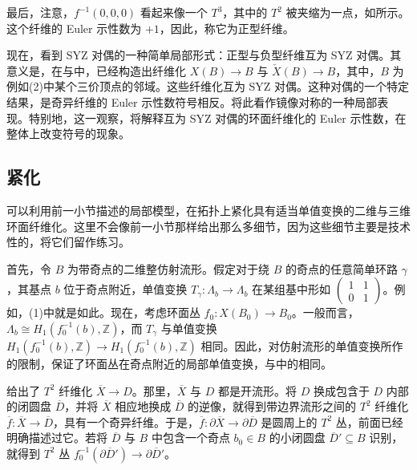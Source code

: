 \begin{definition*}[正型纤维]\label{def:6.positive-fibre}
最后，注意，$f^{-1}(0,0,0)$ 看起来像一个 $T^3$，其中的 $T^2$ 被夹缩为一点，如所示。这个纤维的 Euler 示性数为 $+1$，因此，称它为正型纤维。
\end{definition*}
\begin{figure}[H]
\centering
{}
\BookNumberOnlyCaption\label{fig:6.10}
\end{figure}

现在，看到 SYZ 对偶的一种简单局部形式：正型与负型纤维互为 SYZ 对偶。其意义是，在与中，已经构造出纤维化 $X(B)\to B$ 与 $\check X(B)\to B$，其中，$B$ 为例如(2)中某个三价顶点的邻域。这些纤维化互为 SYZ 对偶。这种对偶的一个特定结果，是奇异纤维的 Euler 示性数符号相反。将此看作镜像对称的一种局部表现。特别地，这一观察，将解释互为 SYZ 对偶的环面纤维化的 Euler 示性数，在整体上改变符号的现象。

\subsection{紧化}\label{sec:6.4.3}

可以利用前一小节描述的局部模型，在拓扑上紧化具有适当单值变换的二维与三维环面纤维化。这里不会像前一小节那样给出那么多细节，因为这些细节主要是技术性的，将它们留作练习。

首先，令 $B$ 为带奇点的二维整仿射流形。假定对于绕 $B$ 的奇点的任意简单环路 $\gamma$，其基点 $b$ 位于奇点附近，单值变换 $T_\gamma\colon\Lambda_b\to\Lambda_b$ 在某组基中形如 $\begin{pmatrix}1&1\\0&1\end{pmatrix}$。例如，(1)中就是如此。现在，考虑环面丛 $f_0\colon X(B_0)\to B_0$。一般而言，$\Lambda_b\cong H_1(f_0^{-1}(b),\mathbb Z)$，而 $T_\gamma$ 与单值变换 $H_1(f_0^{-1}(b),\mathbb Z)\to H_1(f_0^{-1}(b),\mathbb Z)$ 相同。因此，对仿射流形的单值变换所作的限制，保证了环面丛在奇点附近的局部单值变换，与中的相同。

给出了 $T^2$ 纤维化 $\overline X\to D$。那里，$\overline X$ 与 $D$ 都是开流形。将 $D$ 换成包含于 $D$ 内部的闭圆盘 $\overline D$，并将 $\overline X$ 相应地换成 $\overline D$ 的逆像，就得到带边界流形之间的 $T^2$ 纤维化 $\overline f\colon\overline X\to\overline D$，具有一个奇异纤维。于是，$\overline f\colon\partial\overline X\to\partial\overline D$ 是圆周上的 $T^2$ 丛，前面已经明确描述过它。若将 $\overline D$ 与 $B$ 中包含一个奇点 $b_0\in B$ 的小闭圆盘 $\overline D'\subseteq B$ 识别，就得到 $T^2$ 丛 $f_0^{-1}(\partial\overline D')\to\partial\overline D'$。


